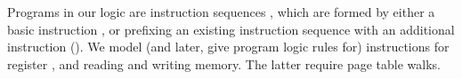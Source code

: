 
Programs in our logic are instruction sequences \instrs, which are formed by either a basic instruction \iskip, or prefixing an existing instruction
sequence with an additional instruction (\iseq\instr\instrs).
We model (and later, give program logic rules for) instructions for  register , and reading and writing memory.
The latter require page table walks.


